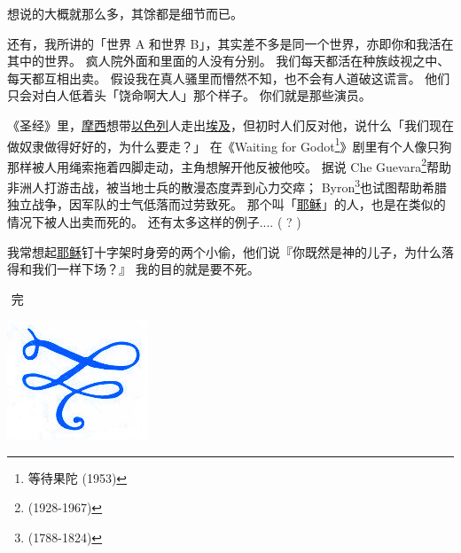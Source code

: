 \documentclass[12pt]{report}
\newcommand*\dashh{\textemdash\,\,}
\begin{document}
{\begin{figure}[ht]
\centering
{}
\end{figure}

想说的大概就那么多，其馀都是细节而已。

还有，我所讲的「世界 A 和世界 B」，其实差不多是同一个世界，亦即你和我活在其中的世界。 疯人院外面和里面的人没有分别。 我们每天都活在种族歧视之中、每天都互相出卖。 假设我在真人骚里而懵然不知，也不会有人道破这谎言。 他们只会对白人低着头「饶命啊大人」那个样子。 你们就是那些演员。

《圣经》里，\uline{摩西}想带\uline{以色列}人走出\uline{埃及}，但初时人们反对他，说什么「我们现在做奴隶做得好好的，为什么要走？」 在《Waiting for Godot\footnote{等待果陀 (1953)}》剧里有个人像只狗那样被人用绳索拖着四脚走动，主角想解开他反被他咬。 据说 Che Guevara\footnote{(1928-1967)}帮助非洲人打游击战，被当地士兵的散漫态度弄到心力交瘁； Byron\footnote{(1788-1824)}也试图帮助希腊独立战争，因军队的士气低落而过劳致死。 那个叫「\uline{耶稣}」的人，也是在类似的情况下被人出卖而死的。 还有太多这样的例子.... ( ? )

我常想起\uline{耶稣}钉十字架时身旁的两个小偷，他们说『你既然是神的儿子，为什么落得和我们一样下场？』 我的目的就是要不死。

\begin{center}
\dashh 完 \dashh \par

\includegraphics[scale=0.5]{vignette0.jpg}
\end{center}

}
\end{document}
